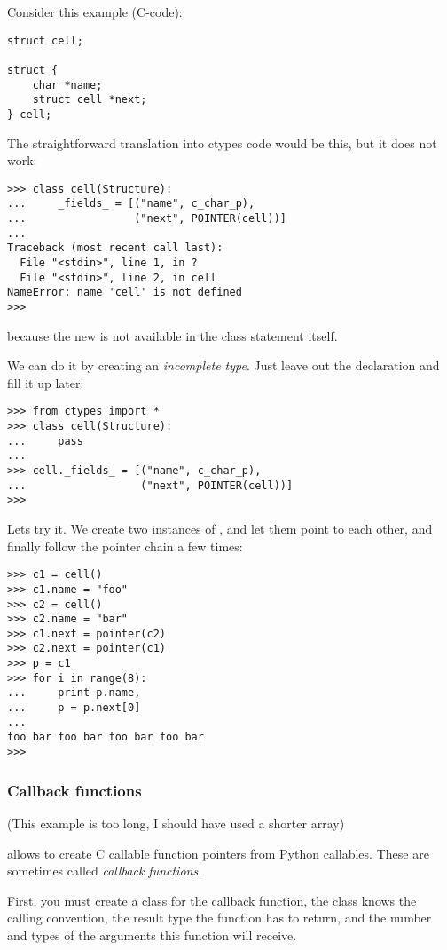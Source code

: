 Consider this example (C-code):
\begin{verbatim}
struct cell;

struct {
    char *name;
    struct cell *next;
} cell;
\end{verbatim}

The straightforward translation into ctypes code would be this, but it
does not work:
\begin{verbatim}
>>> class cell(Structure):
...     _fields_ = [("name", c_char_p),
...                 ("next", POINTER(cell))]
...
Traceback (most recent call last):
  File "<stdin>", line 1, in ?
  File "<stdin>", line 2, in cell
NameError: name 'cell' is not defined
>>>
\end{verbatim}

because the new  is not available in the class statement
itself.

We can do it by creating an \emph{incomplete type}. Just leave out the
 declaration and fill it up later:
\begin{verbatim}
>>> from ctypes import *
>>> class cell(Structure):
...     pass
...
>>> cell._fields_ = [("name", c_char_p),
...                  ("next", POINTER(cell))]
>>>
\end{verbatim}

Lets try it. We create two instances of , and let them point
to each other, and finally follow the pointer chain a few times:
\begin{verbatim}
>>> c1 = cell()
>>> c1.name = "foo"
>>> c2 = cell()
>>> c2.name = "bar"
>>> c1.next = pointer(c2)
>>> c2.next = pointer(c1)
>>> p = c1
>>> for i in range(8):
...     print p.name,
...     p = p.next[0]
...
foo bar foo bar foo bar foo bar
>>>
\end{verbatim}


\subsubsection{Callback functions\label{ctypes-callback-functions}}

(This example is too long, I should have used a shorter array)

 allows to create C callable function pointers from Python
callables. These are sometimes called \emph{callback functions}.

First, you must create a class for the callback function, the class
knows the calling convention, the result type the function has to
return, and the number and types of the arguments this function will
receive.

